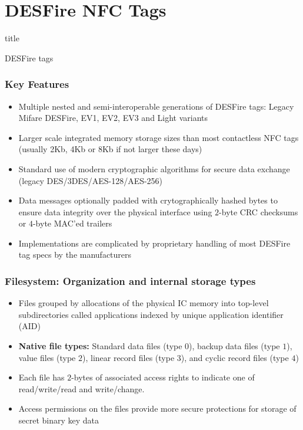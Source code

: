 \documentclass[usenames,svgnames,dvipsnames,11pt]{beamer}
\newcommand{\TitleBoxed}[1]{
     \begin{beamercolorbox}[sep=8pt,center,shadow=true,rounded=true]{title}
          \usebeamerfont{title}#1\par%
     \end{beamercolorbox}
}
\begin{document}
\section{DESFire NFC Tags} 

\begin{frame}
\TitleBoxed{
     \Huge{\centerline{DESFire tags}}
}
\end{frame}

\begin{frame}
\frametitle{Key Features}

\begin{itemize}
\item Multiple nested and semi-interoperable generations of DESFire tags: 
      Legacy Mifare DESFire, EV1, EV2, EV3 and Light variants 
\item Larger scale integrated memory storage sizes than most contactless NFC tags 
      (usually 2Kb, 4Kb or 8Kb if not larger these days) 
\item Standard use of modern cryptographic algorithms for 
      secure data exchange (legacy DES/3DES/AES-128/AES-256)
\item Data messages optionally padded with crytographically hashed bytes to ensure data 
      integrity over the physical interface using $2$-byte CRC checksums or $4$-byte MAC'ed trailers
\item Implementations are complicated by proprietary handling of most DESFire tag specs by the 
      manufacturers 
\end{itemize}

\end{frame}

\begin{frame}
\frametitle{Filesystem: Organization and internal storage types}

\begin{itemize}
\item Files grouped by allocations of the physical IC memory into 
      top-level subdirectories called applications indexed by unique 
      application identifier (AID)
\item \textbf{Native file types:} Standard data files (type $0$), backup data files (type $1$), 
      value files (type $2$), linear record files (type $3$), and cyclic record files (type $4$)
\item Each file has $2$-bytes of associated access rights to indicate one of 
      read/write/read and write/change.
\item Access permissions on the files provide more secure protections for storage of secret binary key data 
\end{itemize}

\end{frame}
\end{document}
